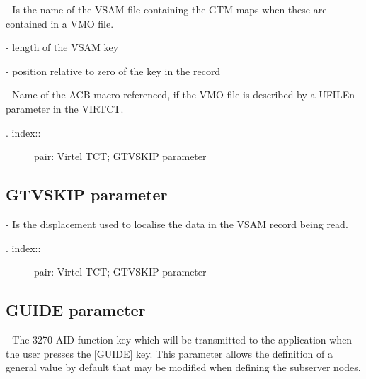 \documentclass[letterpaper,10pt,english]{sphinxmanual}
\begin{document}
 - Is the name of the VSAM file containing the GTM maps when these are contained in a VMO file.

 - length of the VSAM key

 - position relative to zero of the key in the record

 - Name of the ACB macro referenced, if the VMO file is described by a UFILEn parameter in the VIRTCT.
\begin{description}
\item[{. index::}] \leavevmode
pair: Virtel TCT; GTVSKIP parameter

\end{description}


\subsection{GTVSKIP parameter}
\label{\detokenize{Installation_Guide:gtvskip-parameter}}
\begin{sphinxVerbatim}[commandchars=\\\{\}]
                
\end{sphinxVerbatim}

 - Is the displacement used to localise the data in the VSAM record being read.
\begin{description}
\item[{. index::}] \leavevmode
pair: Virtel TCT; GTVSKIP parameter

\end{description}


\subsection{GUIDE parameter}
\label{\detokenize{Installation_Guide:guide-parameter}}
\begin{sphinxVerbatim}[commandchars=\\\{\}]
                  
\end{sphinxVerbatim}

 - The 3270 AID function key which will be transmitted to the application when the user presses the {[}GUIDE{]} key. This parameter allows the definition of a general value by default that may be modified when defining the subserver nodes.
\end{document}

